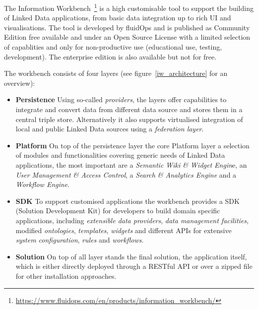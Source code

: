 The Information Workbench~\footnote{\url{https://www.fluidops.com/en/products/information_workbench/}} is a high customisable tool to support the building of Linked Data applications, from basic data integration up to rich UI and visualisations. The tool is developed by fluidOps and is published as Community Edition free available and under an Open Source License with a limited selection of capablities and only for non-productive use (educational use, testing, development). The enterprise edition is also available but not for free.

\newpage

The workbench consists of four layers (see figure~\ref{iw_architecture} for an overview):~\cite{haase2011information}~\cite{gossenainformation}

\begin{itemize}

\item \textbf{Persistence}
Using so-called \emph{providers}, the layers offer capabilities to integrate and convert data from different data source and stores them in a central triple store. Alternatively it also supports virtualised integration of local and public Linked Data sources using a \emph{federation layer}.

\item \textbf{Platform}
On top of the persistence layer the core Platform layer a selection of modules and functionalities covering generic needs of Linked Data applications, the most important are a \emph{Semantic Wiki \& Widget Engin}e, an \emph{User Management \& Access Control}, a \emph{Search \& Analytics Engine} and a \emph{Workflow Engine}.

\item \textbf{SDK} To support customised applications the workbench provides a SDK (Solution Development Kit) for developers to build domain specific applications, including \emph{extensible data providers}, \emph{data management facilities}, modified \emph{ontologies}, \emph{templates}, \emph{widgets} and different APIs for extensive \emph{system configuration}, \emph{rules} and \emph{workflows}.

\item \textbf{Solution}
On top of all layer stands the final solution, the application itself, which is either directly deployed through a RESTful API or over a zipped file for other installation approaches.

\end{itemize}

